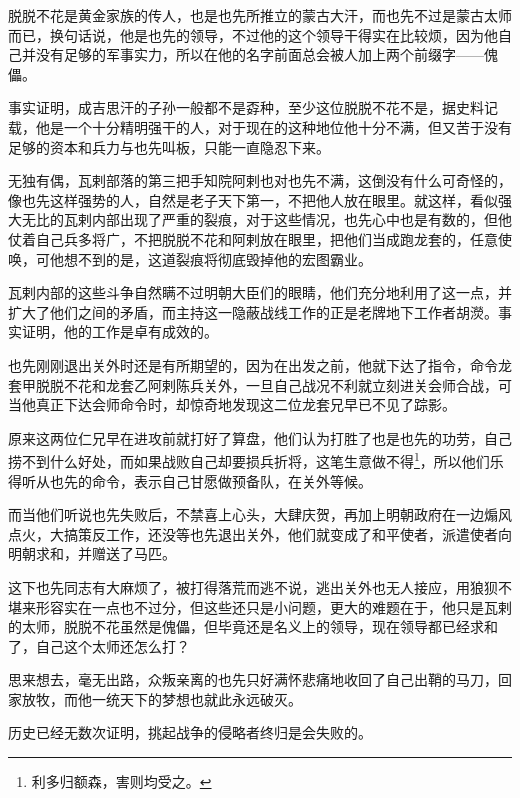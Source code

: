 \begin{multicols}{\theparacolNo}
脱脱不花是黄金家族的传人，也是也先所推立的蒙古大汗，而也先不过是蒙古太师而已，换句话说，他是也先的领导，不过他的这个领导干得实在比较烦，因为他自己并没有足够的军事实力，所以在他的名字前面总会被人加上两个前缀字——傀儡。

事实证明，成吉思汗的子孙一般都不是孬种，至少这位脱脱不花不是，据史料记载，他是一个十分精明强干的人，对于现在的这种地位他十分不满，但又苦于没有足够的资本和兵力与也先叫板，只能一直隐忍下来。

无独有偶，瓦剌部落的第三把手知院阿剌也对也先不满，这倒没有什么可奇怪的，像也先这样强势的人，自然是老子天下第一，不把他人放在眼里。就这样，看似强大无比的瓦剌内部出现了严重的裂痕，对于这些情况，也先心中也是有数的，但他仗着自己兵多将广，不把脱脱不花和阿剌放在眼里，把他们当成跑龙套的，任意使唤，可他想不到的是，这道裂痕将彻底毁掉他的宏图霸业。

瓦剌内部的这些斗争自然瞒不过明朝大臣们的眼睛，他们充分地利用了这一点，并扩大了他们之间的矛盾，而主持这一隐蔽战线工作的正是老牌地下工作者胡濙。事实证明，他的工作是卓有成效的。

也先刚刚退出关外时还是有所期望的，因为在出发之前，他就下达了指令，命令龙套甲脱脱不花和龙套乙阿剌陈兵关外，一旦自己战况不利就立刻进关会师合战，可当他真正下达会师命令时，却惊奇地发现这二位龙套兄早已不见了踪影。

原来这两位仁兄早在进攻前就打好了算盘，他们认为打胜了也是也先的功劳，自己捞不到什么好处，而如果战败自己却要损兵折将，这笔生意做不得\footnote{利多归额森，害则均受之。}，所以他们乐得听从也先的命令，表示自己甘愿做预备队，在关外等候。

而当他们听说也先失败后，不禁喜上心头，大肆庆贺，再加上明朝政府在一边煽风点火，大搞策反工作，还没等也先退出关外，他们就变成了和平使者，派遣使者向明朝求和，并赠送了马匹。

这下也先同志有大麻烦了，被打得落荒而逃不说，逃出关外也无人接应，用狼狈不堪来形容实在一点也不过分，但这些还只是小问题，更大的难题在于，他只是瓦剌的太师，脱脱不花虽然是傀儡，但毕竟还是名义上的领导，现在领导都已经求和了，自己这个太师还怎么打？

思来想去，毫无出路，众叛亲离的也先只好满怀悲痛地收回了自己出鞘的马刀，回家放牧，而他一统天下的梦想也就此永远破灭。

历史已经无数次证明，挑起战争的侵略者终归是会失败的。
\ifnum{}
	\end{multicols}
\fi
\newpage
